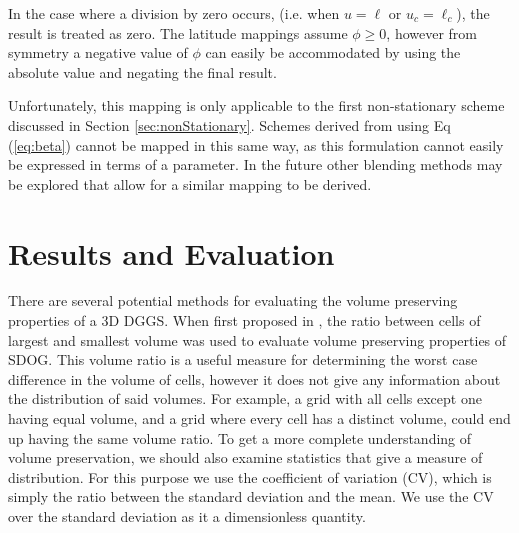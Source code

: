 In the case where a division by zero occurs, (i.e. when $u = \ell$ or $u_{c} = \ell_{c}$), the result is treated as zero. The latitude mappings assume $\phi \ge 0$, however from symmetry a negative value of $\phi$ can easily be accommodated by using the absolute value and negating the final result.

Unfortunately, this mapping is only applicable to the first non-stationary scheme discussed in Section \ref{sec:nonStationary}. Schemes derived from using Eq (\ref{eq:beta}) cannot be mapped in this same way, as this formulation cannot easily be expressed in terms of a parameter. In the future other blending methods may be explored that allow for a similar mapping to be derived. 

\section{Results and Evaluation} \label{sec:results}
There are several potential methods for evaluating the volume preserving properties of a 3D DGGS. When first proposed in \cite{yu2009sdog}, the ratio between cells of largest and smallest volume was used to evaluate volume preserving properties of SDOG. This volume ratio is a useful measure for determining the worst case difference in the volume of cells, however it does not give any information about the distribution of said volumes. For example, a grid with all cells except one having equal volume, and a grid where every cell has a distinct volume, could end up having the same volume ratio. To get a more complete understanding of volume preservation, we should also examine statistics that give a measure of distribution. For this purpose we use the coefficient of variation (CV), which is simply the ratio between the standard deviation and the mean. We use the CV over the standard deviation as it a dimensionless quantity.

